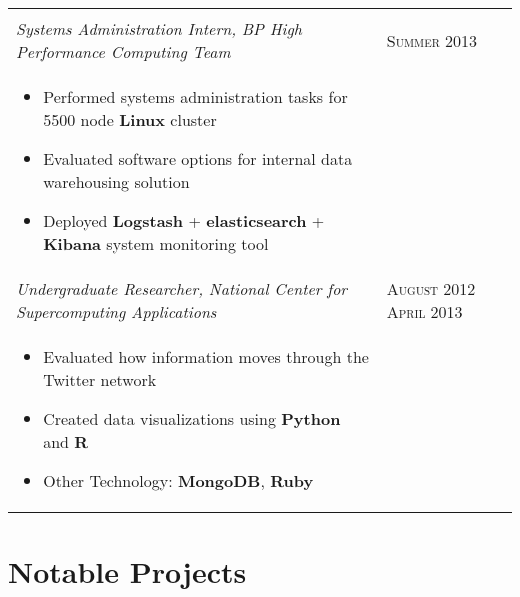 \documentclass[letterpaper,10pt]{article}
\begin{document}
\begin{tabular}{p{12.8cm}>{\raggedleft\arraybackslash}p{3cm}}
\begin{itemize}
    \end{itemize} \\

    \emph{Systems Administration Intern, BP High Performance Computing Team} &
    \textsc{Summer 2013} \\

    \vspace{-2mm}
    \begin{itemize}
        \item
            Performed systems administration tasks for 5500 node \textbf{Linux} cluster
        \item
            Evaluated software options for internal data warehousing solution
        \item
            Deployed \textbf{Logstash} + \textbf{elasticsearch} +
            \textbf{Kibana} system monitoring tool
    \end{itemize} \\

    \emph{Undergraduate Researcher, National Center for Supercomputing Applications} &
    \textsc{August 2012 April 2013} \\

    \vspace{-6mm}
    \begin{itemize}
        \item
            Evaluated how information moves through the Twitter network
        \item
            Created data visualizations using \textbf{Python} and \textbf{R}
        \item
            Other Technology: \textbf{MongoDB}, \textbf{Ruby}
    \end{itemize}
\end{tabular}

\section{Notable Projects}
\end{document}

